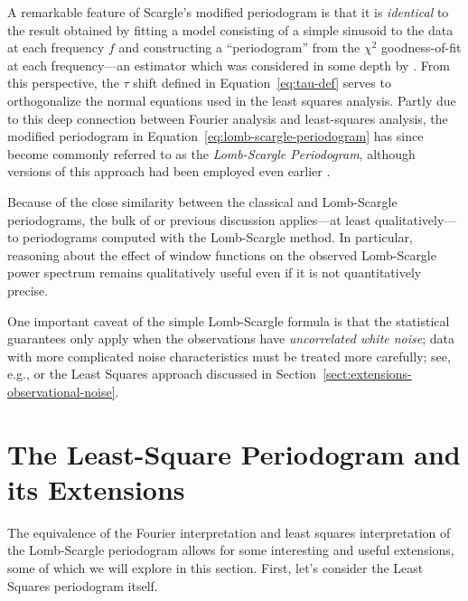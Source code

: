 \documentclass[preprint]{aastex}
\newcommand{\Eq}[1]{Equation~\ref{eq:#1}}
\newcommand{\eq}[1]{\Eq{#1}}
\newcommand{\Sect}[1]{Section~\ref{sect:#1}}
\newcommand{\sect}[1]{\Sect{#1}}
\newcommand{\sectlabel}[1]{\label{sect:#1}}
\begin{document}
A remarkable feature of Scargle's modified periodogram is that it is
{\it identical} to the result
obtained by fitting a model consisting of a simple sinusoid to the data at
each frequency $f$ and
constructing a ``periodogram'' from the $\chi^2$ goodness-of-fit at each
frequency---an estimator which was considered in some depth by \citet{Lomb76}.
From this perspective, the $\tau$ shift defined in \eq{tau-def} serves to
orthogonalize the normal equations used in the least squares analysis.
Partly due to this deep connection between Fourier analysis and least-squares
analysis, the modified periodogram in \eq{lomb-scargle-periodogram}
has since become commonly referred to as the {\it Lomb-Scargle Periodogram},
although versions of this approach had been employed even earlier
\citep[see, e.g.][]{Gottlieb75}.

Because of the close similarity between the classical and Lomb-Scargle periodograms,
the bulk of or previous discussion applies---at least qualitatively---to
periodograms computed with the Lomb-Scargle method.
In particular, reasoning about the effect of window functions on the observed
Lomb-Scargle power spectrum remains qualitatively useful even if it is not
quantitatively precise.

One important caveat of the simple Lomb-Scargle formula is that the statistical
guarantees only apply when the observations have {\it uncorrelated white
noise}; data with more complicated noise characteristics must be treated
more carefully; see, e.g., \citet{Vio2010} or the Least Squares approach
discussed in \sect{extensions-observational-noise}.


\section{The Least-Square Periodogram and its Extensions}
\sectlabel{lomb-scargle-extensions}

The equivalence of the Fourier interpretation and least squares interpretation of the Lomb-Scargle periodogram allows for some interesting and useful
extensions, some of which we will explore in this section.
First, let's consider the Least Squares periodogram itself.
\end{document}
